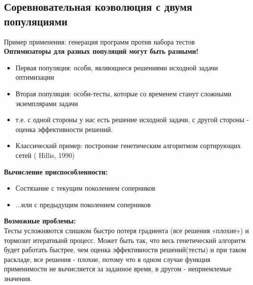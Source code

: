 \subsection{Соревновательная коэволюция с двумя популяциями}
Пример применения: генерация программ против набора тестов\\
\textbf{Оптимизаторы для разных популяций могут быть разными!}
\begin{itemize}
    \item Первая популяция: особи, являющиеся решениями исходной задачи оптимизации
    \item Вторая популяция: особи-тесты, которые со временем станут сложными экземплярами задачи
    \item т.е. с одной стороны у нас есть решение исходной задачи, с другой стороны - оценка эффективности решений.
    \item Классический пример: построение генетическим алгоритмом сортирующих сетей ( Hillis, 1990)
\end{itemize}
\textbf{Вычисление приспособленности:}
\begin{itemize}
    \item Состязание с текущим поколением соперников
    \item ...или с предыдущим поколением соперников
\end{itemize}

\textbf{Возможные проблемы:}\\
Тесты усложняются слишком быстро потеря градиента (все решения «плохие») и тормозит итератиынй процесс. Может быть так, что весь генетический алгоритм будет работать быстрее, чем оценка эффективности решений(тесты) и при таком раскладе, все решения - плохие, потому что в одном случае функция применимости не вычисляется за заданное время, в другом - неприемлемые значения.
